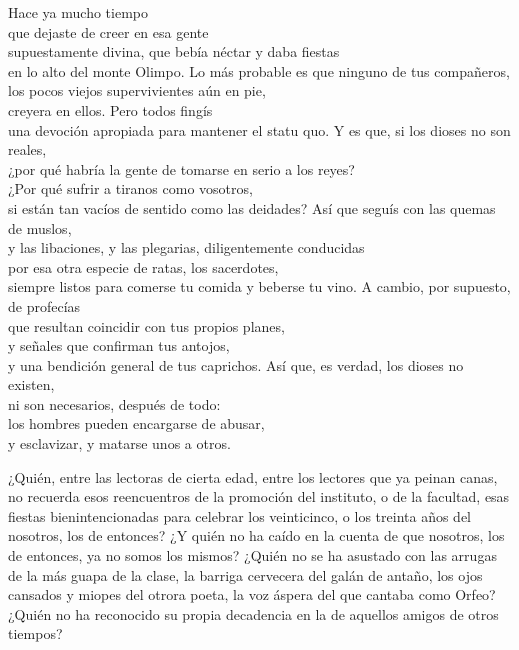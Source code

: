 \begin{versopropio}
Hace ya mucho tiempo\\
que dejaste de creer en esa gente\\
supuestamente divina, que bebía néctar y daba fiestas\\
en lo alto del monte Olimpo.
\stanzabreak
Lo más probable es que ninguno de tus compañeros,\\
los pocos viejos supervivientes aún en pie,\\
creyera en ellos. Pero todos fingís\\
una devoción apropiada para mantener el statu quo.
\stanzabreak
Y es que, si los dioses no son reales,\\
¿por qué habría la gente de tomarse en serio a los reyes?\\
¿Por qué sufrir a tiranos como vosotros,\\
si están tan vacíos de sentido como las deidades?
\stanzabreak
Así que seguís con las quemas de muslos,\\
y las libaciones, y las plegarias, diligentemente conducidas\\
por esa otra especie de ratas, los sacerdotes,\\
siempre listos para comerse tu comida y beberse tu vino.
\stanzabreak
A cambio, por supuesto, de profecías\\
que resultan coincidir con tus propios planes,\\
y señales que confirman tus antojos,\\
y una bendición general de tus caprichos.
\stanzabreak
Así que, es verdad, los dioses no existen,\\
ni son necesarios, después de todo:\\
los hombres pueden encargarse de abusar,\\
y esclavizar, y matarse unos a otros.
\end{versopropio}

¿Quién, entre las lectoras de cierta edad, entre los lectores que ya peinan canas, no recuerda esos reencuentros de la promoción del instituto, o de la facultad, esas fiestas bienintencionadas para celebrar los veinticinco, o los treinta años del nosotros, los de entonces? ¿Y quién no ha caído en la cuenta de que nosotros, los de entonces, ya no somos los mismos? ¿Quién no se ha asustado con las arrugas de la más guapa de la clase, la barriga cervecera del galán de antaño, los ojos cansados y miopes del otrora poeta, la voz áspera del que cantaba como Orfeo? ¿Quién no ha reconocido su propia decadencia en la de aquellos amigos de otros tiempos?

